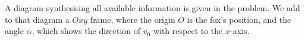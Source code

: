 %
%

\begin{center}
\vspace*{5mm}
\end{center}


A diagram synthesising all available information is given in the problem. We add to that diagram a $Oxy$ frame, where the origin $O$ is the fox's position, and the angle $\alpha$, which shows the direction of $v_0$ with respect to the $x$-axis.
\begin{center}

\end{center}
